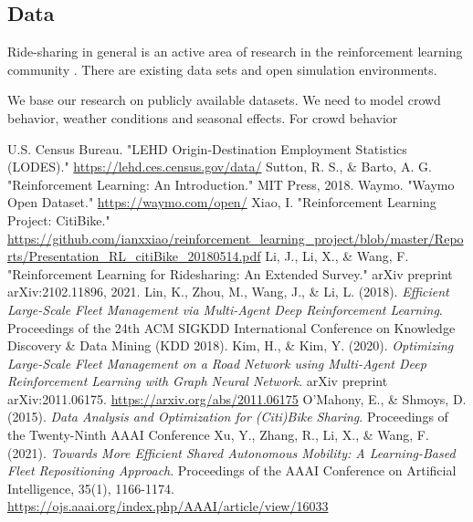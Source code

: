 \documentclass[12pt]{article}
\begin{document}
\subsection*{Data}
Ride-sharing in general is an active area of research in the reinforcement learning
community \cite{ridesharing_survey}. There are existing data sets and open simulation environments.

We base our research on publicly available datasets. We need to model crowd behavior,
weather conditions and seasonal effects. For crowd behavior

\begin{thebibliography}{9}

		 U.S. Census Bureau. "LEHD Origin-Destination Employment Statistics
		(LODES)." \url{https://lehd.ces.census.gov/data/}
		 Sutton, R. S., \& Barto, A. G. "Reinforcement Learning: An
		Introduction." MIT Press, 2018.
		 Waymo. "Waymo Open Dataset." \url{https://waymo.com/open/}
		 Xiao, I. "Reinforcement Learning Project: CitiBike."
		\url{https://github.com/ianxxiao/reinforcement_learning_project/blob/master/Reports/Presentation_RL_citiBike_20180514.pdf}
		 Li, J., Li, X., \& Wang, F. "Reinforcement Learning for
		Ridesharing: An Extended Survey." arXiv preprint arXiv:2102.11896, 2021.
		 Lin, K., Zhou, M., Wang, J., \& Li, L. (2018). \textit{Efficient
		Large-Scale Fleet Management via Multi-Agent Deep Reinforcement Learning}. Proceedings
		of the 24th ACM SIGKDD International Conference on Knowledge Discovery \& Data Mining (KDD 2018).
		 Kim, H., \& Kim, Y. (2020). \textit{Optimizing Large-Scale Fleet
				Management on a Road Network using Multi-Agent Deep Reinforcement Learning with Graph
		Neural Network}. arXiv preprint arXiv:2011.06175. \url{https://arxiv.org/abs/2011.06175}
		 O’Mahony, E., \& Shmoys, D. (2015). \textit{Data Analysis and
		Optimization for (Citi)Bike Sharing}. Proceedings of the Twenty-Ninth AAAI Conference
		 Xu, Y., Zhang, R., Li, X., \& Wang, F. (2021). \textit{Towards More
		Efficient Shared Autonomous Mobility: A Learning-Based Fleet Repositioning Approach}.
		Proceedings of the AAAI Conference on Artificial Intelligence, 35(1), 1166-1174.
		\url{https://ojs.aaai.org/index.php/AAAI/article/view/16033}
\end{thebibliography}
\end{document}
